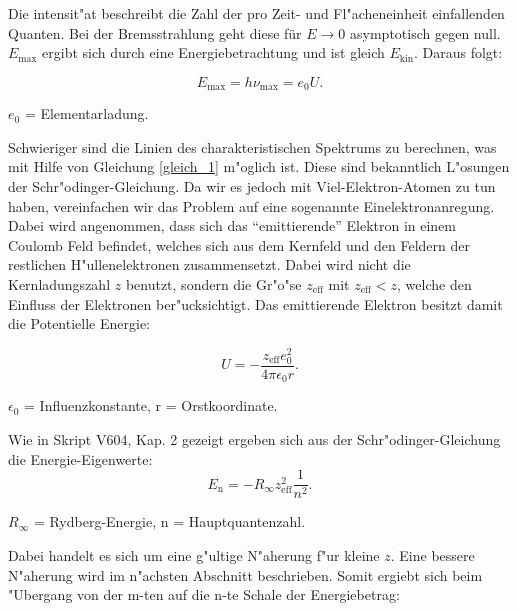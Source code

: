 		Die intensit"at beschreibt die Zahl der pro Zeit- und Fl"acheneinheit einfallenden Quanten.
		Bei der Bremsstrahlung geht diese für $E \rightarrow 0$ asymptotisch gegen null. $E_\mathrm{max}$ ergibt sich durch eine Energiebetrachtung und ist gleich $E_\mathrm{kin}$.
		Daraus folgt:

		\begin{equation}
			E_\mathrm{max} = h\nu_\mathrm{max} = e_\mathrm{0}U. \label{gleich_2}
		\end{equation}
		\begin{center}
			$e_\mathrm{0}$ = Elementarladung.
		\end{center}

		Schwieriger sind die Linien des charakteristischen Spektrums zu berechnen, was mit Hilfe von Gleichung \eqref{gleich_1} m"oglich ist.
		Diese sind bekanntlich L"osungen der Schr"odinger-Gleichung. 
		Da wir es jedoch mit Viel-Elektron-Atomen zu tun haben, vereinfachen wir das Problem auf eine sogenannte Einelektronanregung.
		Dabei wird angenommen, dass sich das "`emittierende"' Elektron in einem Coulomb Feld befindet, welches sich aus dem Kernfeld und den Feldern der restlichen H"ullenelektronen zusammensetzt.
		Dabei wird nicht die Kernladungszahl $z$ benutzt, sondern die Gr"o"se $z_\mathrm{eff}$ mit $z_\mathrm{eff} < z$, welche den Einfluss der Elektronen ber"ucksichtigt.
		Das emittierende Elektron besitzt damit die Potentielle Energie:

		\begin{equation}
			U = -\frac{z_\mathrm{eff} e_\mathrm{0}^2}{4 \pi \epsilon_\mathrm{0} r}. \label{gleich_3}
		\end{equation}
		\begin{center}
			$\epsilon_\mathrm{0}$ = Influenzkonstante, r = Orstkoordinate.
		\end{center}

		Wie in Skript V604, Kap. 2 gezeigt ergeben sich aus der Schr"odinger-Gleichung die Energie-Eigenwerte: 		
		\begin{equation}
			E_\mathrm{n} = - R_\infty z_\mathrm{eff}^2 \frac{1}{n^2}. \label{gleich_4}
		\end{equation}
		\begin{center}
			$R_\infty$ = Rydberg-Energie, n = Hauptquantenzahl.
		\end{center}

		Dabei handelt es sich um eine g"ultige N"aherung f"ur kleine $z$.
		Eine bessere N"aherung wird im n"achsten Abschnitt beschrieben.
		Somit ergiebt sich beim "Ubergang von der m-ten auf die n-te Schale der Energiebetrag:


